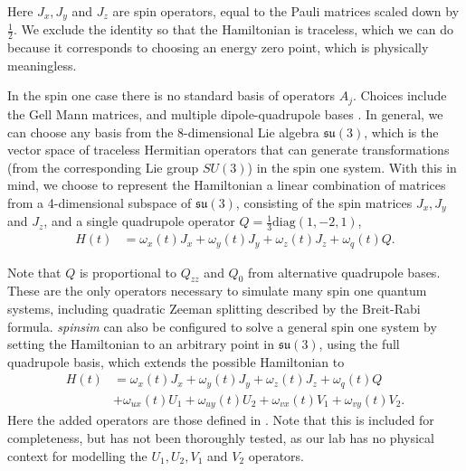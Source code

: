 \documentclass{jors}
\begin{document}
		Here \(J_x, J_y\) and \(J_z\) are spin operators, equal to the Pauli matrices scaled down by \(\frac12\).
		We exclude the identity so that the Hamiltonian is traceless, which we can do because it corresponds to choosing an energy zero point, which is physically meaningless.

		In the spin one case there is no standard basis of operators \(A_j\).
		Choices include the Gell Mann matrices, and multiple dipole-quadrupole bases \cite{hamley_spin-nematic_2012}\cite{di_dipolequadrupole_2010}.
		In general, we can choose any basis from the 8-dimensional Lie algebra \(\mathfrak{su}(3)\), which is the vector space of traceless Hermitian operators that can generate transformations (from the corresponding Lie group \(SU(3)\)) in the spin one system.
		With this in mind, we choose to represent the Hamiltonian a linear combination of matrices from a 4-dimensional subspace of \(\mathfrak{su}(3)\), consisting of the spin matrices \(J_x, J_y\) and \(J_z\), and a single quadrupole operator \(Q = \frac13\mathrm{diag}(1, -2, 1)\),
		\begin{align}
			H(t) &= \omega_x(t) J_x + \omega_y(t) J_y + \omega_z(t) J_z + \omega_q(t) Q.
		\end{align}
		
		Note that \(Q\) is proportional to \(Q_{zz}\) \cite{hamley_spin-nematic_2012} and \(Q_0\) \cite{di_dipolequadrupole_2010} from alternative quadrupole bases.
		These are the only operators necessary to simulate many spin one quantum systems, including quadratic Zeeman splitting described by the Breit-Rabi formula.
		\emph{spinsim} can also be configured to solve a general spin one system by setting the Hamiltonian to an arbitrary point in \(\mathfrak{su}(3)\), using the full quadrupole basis, which extends the possible Hamiltonian to
		\begin{align}
			H(t) &= \omega_x(t) J_x + \omega_y(t) J_y + \omega_z(t) J_z + \omega_q(t) Q\nonumber\\
			&+ \omega_{ux}(t) U_1 + \omega_{uy}(t) U_2 + \omega_{vx}(t) V_1 + \omega_{vy}(t) V_2.
		\end{align}
		Here the added operators are those defined in \cite{di_dipolequadrupole_2010}. Note that this is included for completeness, but has not been thoroughly tested, as our lab has no physical context for modelling the \(U_1, U_2, V_1\) and \(V_2\) operators.
\end{document}
